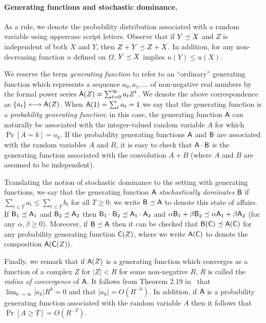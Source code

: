 \paragraph{Generating functions and stochastic dominance.}
  As a rule, we denote the
  probability distribution associated with a random variable using
  uppercase script letters. 
  Observe that if $Y \preceq X$ and 
  $Z$ is independent of both $X$ and $Y$, 
  then $Z + Y \preceq Z + X$. 
  In addition, for any non-decreasing function $u$ defined on $\Omega$, 
  $Y \preceq X$ implies $u(Y) \leq u(X)$.

  We reserve the term
  \emph{generating function} to refer to an ``ordinary'' generating
  function which represents a sequence $a_0, a_1, \ldots$ of
  non-negative real numbers by the formal power series
  $\mathsf{A}(Z) = \sum_{t = 0}^\infty a_t Z^t$. 
  We denote the above correspondence as $\{a_t\} \longleftrightarrow \mathsf{A}(Z)$. 
  When
  $\mathsf{A}(1) = \sum_t a_t = 1$ we say that the generating function is
  a \emph{probability generating function}; in this case, the
  generating function $\mathsf{A}$ can naturally be associated with the
  integer-valued random variable $A$ for which $\Pr[A = k] = a_k$. If
  the probability generating functions $\mathsf{A}$ and $\mathsf{B}$ are
  associated with the random variables $A$ and $B$, it is easy to
  check that $\mathsf{A} \cdot \mathsf{B}$ is the generating function
  associated with the convolution $A + B$ (where $A$ and $B$ are
  assumed to be independent).  

  Translating the notion of stochastic
  dominance to the setting with generating functions, we say that the
  generating function $\mathsf{A}$ \emph{stochastically dominates}
  $\mathsf{B}$ if $\sum_{t \leq T} a_t \leq \sum_{t \leq T} b_t$ for all
  $T \geq 0$; we write $\mathsf{B} \preceq \mathsf{A}$ to denote this state of
  affairs. If $\mathsf{B}_1 \preceq \mathsf{A}_1$ and
  $\mathsf{B}_2 \preceq \mathsf{A}_2$ then
  $\mathsf{B}_1 \cdot \mathsf{B}_2 \preceq \mathsf{A}_1 \cdot \mathsf{A}_2$ and
  $\alpha \mathsf{B}_1 + \beta \mathsf{B}_2 \preceq \alpha \mathsf{A}_1 + \beta
  \mathsf{A}_2$ (for any $\alpha, \beta \geq 0$).  Moreover, if
  $\mathsf{B} \preceq \mathsf{A}$ then it can be checked that
  $\mathsf{B}(\mathsf{C}) \preceq \mathsf{A}(\mathsf{C})$ for any probability
  generating function $\mathsf{C}(Z)$, where we write $\mathsf{A}(\mathsf{C})$ to
  denote the composition $\mathsf{A}(\mathsf{C}(Z))$.


  Finally, we remark that
  if $\mathsf{A}(Z)$ is a generating function which converges as a
  function of a complex $Z$ for $|Z| < R$ for some non-negative $R$, 
  $R$ is called the \emph{radius of convergence} of $\mathsf{A}$.  
  It follows from Theorem 2.19 in~\cite{WilfGF} that 
  $\lim_{k \rightarrow \infty} {|a_k|}R^k = 0$ and that $|a_k| = O(R^{-k})$. 
  In addition, if $\mathsf{A}$ is a probability generating function associated with the
  random variable $A$ then it follows that
  $\Pr[A \geq T] = O(R^{-T})$.



